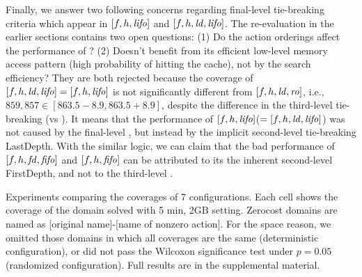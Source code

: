 Finally, we answer two following concerns regarding \lifo final-level
tie-breaking criteria which appear in $[f,h,\mbox{\textit{lifo}}]$ and
$[f,h,\mbox{\textit{ld}},\mbox{\textit{lifo}}]$. The re-evaluation in the earlier sections contains
two open questions: (1) Do the action orderings affect the performance of \lifo? 
(2) Doesn't \lifo benefit from its efficient low-level memory access pattern (high
probability of hitting the cache), not by the search efficiency?
They are both rejected because the
coverage of $[f,h,\mbox{\textit{ld}},\mbox{\textit{lifo}}]=[f,h,\mbox{\textit{lifo}}]$ is not significantly
different from $[f,h,\mbox{\textit{ld}},\mbox{\textit{ro}}]$, i.e.,
$859,857 \in [863.5-8.9,863.5+8.9]$,
despite the difference in the third-level tie-breaking (\lifo vs \ro).
% 
It means that the
performance of $[f,h,\mbox{\textit{lifo}}]$($=[f,h,\mbox{\textit{ld}},\mbox{\textit{lifo}}]$) was not caused by the final-level
\lifo, but instead by the implicit second-level tie-breaking LastDepth.
% 
With the similar logic, we can claim that the bad performance of
$[f,h,\mbox{\textit{fd}},\mbox{\textit{fifo}}]$ and $[f,h,\mbox{\textit{fifo}}]$ can be attributed to its the
inherent second-level FirstDepth, and not to the third-level \fifo.


\begin{table}[tb]
 \centering
 
 \caption{Experiments comparing the coverages of 7 configurations.
 Each cell shows the coverage of the domain solved with 5 min, 2GB
 setting. Zerocost domains are named as
 [original name]-[name of nonzero action].
 For the space reason, we omitted those domains in which all coverages are
 the same (deterministic configuration),
 or did not pass the Wilcoxon significance test under $p=0.05$ (randomized configuration).
 Full results are in the supplemental material.
}  \label{depth}
\end{table}

